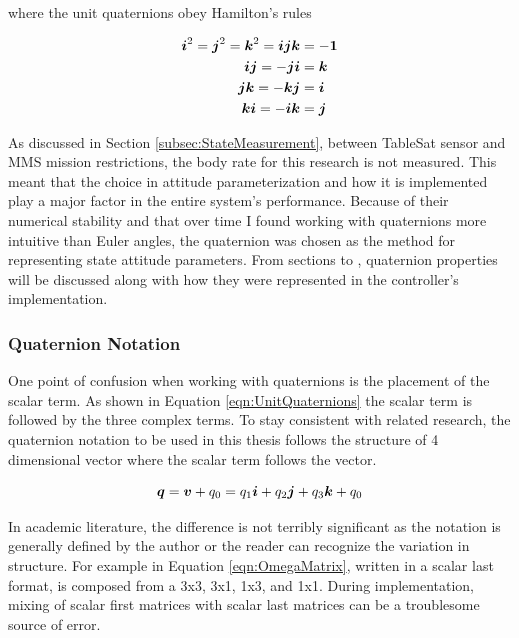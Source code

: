 where the unit quaternions obey Hamilton's rules \cite{wolfram_quaternion}

\begin{subequations}
  \begin{align}
    \boldsymbol{i}^2 = \boldsymbol{j}^2 = \boldsymbol{k}^2 = \boldsymbol{ijk} & = - \boldsymbol{1} \\
    \boldsymbol{i}\boldsymbol{j} = -\boldsymbol{j}\boldsymbol{i} &= \boldsymbol{k} \\
    \boldsymbol{j}\boldsymbol{k} = -\boldsymbol{k}\boldsymbol{j} &= \boldsymbol{i} \\
    \boldsymbol{k}\boldsymbol{i} = -\boldsymbol{i}\boldsymbol{k} &= \boldsymbol{j}
  \end{align}
  \label{eqn:HamiltonRules}
\end{subequations}

As discussed in Section \ref{subsec:StateMeasurement}, between TableSat sensor and MMS mission restrictions, the body rate for this research is not measured.  This meant that the choice in attitude parameterization and how it is implemented play a major factor in the entire system's performance.  Because of their numerical stability and that over time I found working with quaternions more intuitive than Euler angles, the quaternion was chosen as the method for representing state attitude parameters.  From sections  to , quaternion properties will be discussed along with how they were represented in the controller's implementation.

\subsubsection{Quaternion Notation}
\label{subsubsec:QuaternionNotation}

One point of confusion when working with quaternions is the placement of the scalar term.  As shown in Equation \ref{eqn:UnitQuaternions} the scalar term is followed by the three complex terms.  To stay consistent with related research, the quaternion notation to be used in this thesis follows the structure of 4 dimensional vector where the scalar term follows the vector.

\begin{equation}
  \boldsymbol{q} = \boldsymbol{v} + q_0 = q_1 \boldsymbol{i} + q_2 \boldsymbol{j} + q_3 \boldsymbol{k} + q_0
\end{equation}

In academic literature, the difference is not terribly significant as the notation is generally defined by the author or the reader can recognize the variation in structure.  For example in Equation \ref{eqn:OmegaMatrix}, written in a scalar last format, is composed from a 3x3, 3x1, 1x3, and 1x1.  During implementation, mixing of scalar first matrices with scalar last matrices can be a troublesome source of error.

